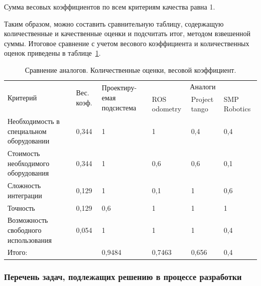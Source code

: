 
Сумма весовых коэффициентов по всем критериям качества равна 1.

Таким образом, можно составить сравнительную таблицу, содержащую количественные и качественные оценки и подсчитать итог, методом взвешенной суммы.
Итоговое сравнение с учетом весового коэффициента и количественных оценок приведены в таблице~\ref{tab:srav_ves}.

\begin{table}[!Htb]
	\caption{Сравнение аналогов. Количественные оценки, весовой коэффициент.}\label{tab:srav_ves}
    \centering
	\begin{tabular}{|p{4cm}|p{2cm}|p{}|p{2cm}|p{2cm}|p{2cm}|}
	\hline 
	\multirow{2}{4cm}{Критерий} & \multirow{2}{2cm}{Вес. коэф. } & \multirow{2}{2,5cm}{Проектиру-емая подсистема} & 	\multicolumn{3}{c|}{Аналоги}\\ 
	\cline{4-6}
	 &  &   & ROS odometry & Project tango & SMP Robotics \\ 
	\hline 
	Необходимость в специальном оборудовании & 0,344 & 1 & 1 & 0,4 & 0,4 \\ 
	\hline 
	Стоимость необходимого оборудования & 0,344 & 1 & 0,6 & 0,6 & 0,1 \\ 	
	\hline 
	Сложность интеграции & 0,129 & 1 & 0,1 & 1 & 0,6 \\
	\hline 
	Точность & 0,129 & 0,6 & 1 & 1 & 1 \\ 
	\hline 
	Возможность свободного использования & 0,054 & 1 & 1 & 1 & 0,4 \\ 
	\hline 
	Итого: &  & 0,9484 & 0,7463 & 0,656 & 0,4 \\ 
	\hline 
	\end{tabular}
\end{table} 


\subsubsection{Перечень задач, подлежащих решению в процессе разработки}

